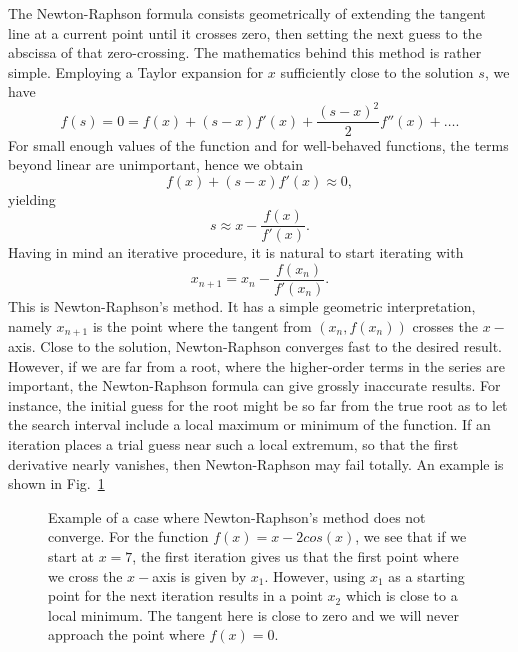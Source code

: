 The
Newton-Raphson formula consists geometrically of 
extending the tangent line at a
current point
until it crosses zero, then setting the next guess
to the abscissa
of that zero-crossing.
The mathematics behind this method is rather simple. Employing a Taylor
expansion for $x$ sufficiently close to the solution $s$, we
have 
\begin{equation}
    f(s)=0=f(x)+(s-x)f'(x)+\frac{(s-x)^2}{2}f''(x) +\dots.
    \label{eq:taylornr}
\end{equation}
For small enough values of the function and for well-behaved functions, 
the terms beyond
linear are unimportant, hence we obtain
\[
   f(x)+(s-x)f'(x)\approx 0,
\]
yielding
\[
   s\approx x-\frac{f(x)}{f'(x)}.
\]
Having in mind an iterative procedure, it is natural to start iterating with
\[
   x_{n+1}=x_n-\frac{f(x_n)}{f'(x_n)}.
\]
This is Newton-Raphson's method. It has a simple geometric interpretation, namely
$x_{n+1}$ is the point where the tangent from $(x_n,f(x_n))$ crosses the $x-$axis.
Close to the solution, Newton-Raphson converges fast
to the desired result. However, if we are
far from a root, where the higher-order terms in the series are important, the
Newton-Raphson formula can give grossly inaccurate results. For
instance, the initial guess for the root might be so far from the true root as to let
the search interval include a local maximum or minimum of the function. 
If an iteration places a trial guess near
such a local extremum, so that the first derivative nearly vanishes, then Newton-Raphson
may fail totally. An example is shown in Fig.\ \ref{fig:chap8fig4}
\begin{figure}
%   
   \caption{Example of a case where Newton-Raphson's
            method does not converge. For the function $f(x)=x-2cos(x)$, we see that 
            if we start at $x=7$, the first iteration gives us that the first point where
            we cross the $x-$axis is given by $x_1$. However, using $x_1$ as a starting
            point for the next iteration results in a point $x_2$ which is close
            to a local minimum. The tangent here is close to zero and we will never
            approach the point where $f(x)=0$.}
   \label{fig:chap8fig4}
\end{figure}

